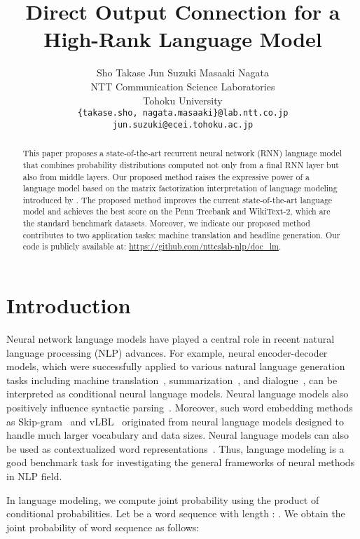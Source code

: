 \documentclass[11pt,a4paper]{article}
\title{Direct Output Connection for a High-Rank Language Model}
\author{Sho Takase \hspace{1.5em} Jun Suzuki \hspace{1.5em} Masaaki Nagata \\
  NTT Communication Science Laboratories \\ Tohoku University \\
  {\tt \{takase.sho, nagata.masaaki\}@lab.ntt.co.jp}  \\ { \tt jun.suzuki@ecei.tohoku.ac.jp}
  }
\date{}
\begin{document}
\maketitle
\begin{abstract}
  This paper proposes a state-of-the-art recurrent neural network (RNN) language model that combines probability distributions computed not only from a final RNN layer but also from middle layers.
  Our proposed method raises the expressive power of a language model based on the matrix factorization interpretation of language modeling introduced by \protect{}.
  The proposed method improves the current state-of-the-art language model and achieves the best score on the Penn Treebank and WikiText-2, which are the standard benchmark datasets.
  Moreover, we indicate our proposed method contributes to two application tasks: machine translation and headline generation.
  Our code is publicly available at: \href{https://github.com/nttcslab-nlp/doc_lm}{https://github.com/nttcslab-nlp/doc\_lm}.
\end{abstract}



\section{Introduction}
\label{sec:intro}
Neural network language models have played a central role in recent natural language processing (NLP) advances.
For example, neural encoder-decoder models, which were successfully applied to various natural language generation tasks including machine translation~\cite{Sutskever:2014:SSL:2969033.2969173}, summarization~\cite{rush-chopra-weston:2015:EMNLP}, and dialogue~\cite{wen-EtAl:2015:EMNLP}, can be interpreted as conditional neural language models.
Neural language models also positively influence syntactic parsing~\cite{dyer-EtAl:2016:N16-1,choe-charniak:2016:EMNLP2016}.
Moreover, such word embedding methods as Skip-gram~\cite{NIPS2013_5021} and vLBL~\cite{NIPS2013_5165} originated from neural language models designed to handle much larger vocabulary and data sizes.
Neural language models can also be used as contextualized word representations~\cite{N18-1202}.
Thus, language modeling is a good benchmark task for investigating the general frameworks of neural methods in NLP field.


In language modeling, we compute joint probability using the product of conditional probabilities.
Let  be a word sequence with length : .
We obtain the joint probability of word sequence  as follows:
\end{document}
